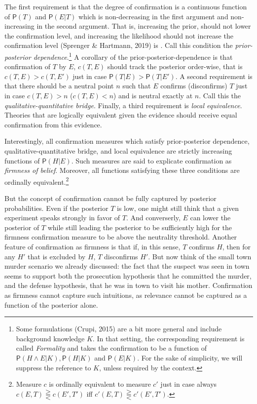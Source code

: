 \documentclass[
  10pt,
  dvipsnames,enabledeprecatedfontcommands]{scrartcl}
\newcommand{\et}{\wedge}
\newcommand{\pr}[1]{\mathsf{P}(#1)}
\begin{document}
The first requirement is that the degree of confirmation is a continuous
function of \(\pr{T}\) and \(\pr{E\vert T}\) which is non-decreasing in
the first argument and non-increasing in the second argument. That is,
increasing the prior, should not lower the confirmation level, and
increasing the likelihood should not increase the confirmation level
(Sprenger \& Hartmann, 2019) is . Call this condition the
\emph{prior-posterior dependence}.\footnote{Some formulations (Crupi,
  2015) are a bit more general and include background knowledge \(K\).
  In that setting, the corresponding requirement is called
  \emph{Formality} and takes the confirmation to be a function of
  \(\pr{H \et E \vert K}, \pr{H\vert K}\) and \(\pr{E\vert K}\). For the
  sake of simplicity, we will suppress the reference to \(K\), unless
  required by the context.} A corollary of the
prior-posterior-dependence is that confirmation of \(T\) by \(E\),
\(c(T,E)\) should track the posterior order-wise, that is
\(c(T,E)>c(T,E')\) just in case \(\pr{T\vert E} > \pr{T\vert E'}\). A
second requirement is that there should be a neutral point \(n\) such
that \(E\) confirms (disconfirms) \(T\) just in case \(c(T,E)>n\)
(\(c(T,E)<n\)) and is neutral exactly at \(n\). Call this the
\emph{qualitative-quantitative bridge}. Finally, a third requirement is
\emph{local equivalence}. Theories that are logically equivalent given
the evidence should receive equal confirmation from this evidence.

Interestingly, all confirmation measures which satisfy prior-posterior
dependence, qualitative-quantitative bridge, and local equivalence are
strictly increasing functions of \(\pr{H \vert E}\). Such measures are
said to explicate confirmation as \emph{firmness of belief}. Moreover,
all functions satisfying these three conditions are ordinally
equivalent.\footnote{Measure $c$ is ordinally equivalent to measure $c'$ just in case always $c(E , T) \gtreqqless c(E', T')$ iff $c'(E , T) \gtreqqless c'(E' , T')$.}

But the concept of confirmation cannot be fully captured by posterior
probabilities. Even if the posterior \(T\) is low, one might still think
that a given experiment speaks strongly in favor of \(T\). And
converserly, \(E\) can lower the posterior of \(T\) while still leading
the posterior to be sufficiently high for the firmness confirmation
measure to be above the neutrality threshold. Another feature of
confirmation as firmness is that if, in this sense, \(T\) confirms
\(H\), then for any \(H'\) that is excluded by \(H\), \(T\) disconfirms
\(H'\). But now think of the small town murder scenario we already
discussed: the fact that the suspect was seen in town seems to support
both the prosecution hypothesis that he committed the murder, and the
defense hypothesis, that he was in town to visit his mother.
Confirmation as firmness cannot capture such intuitions, as relevance
cannot be captured as a function of the posterior alone.
\end{document}
